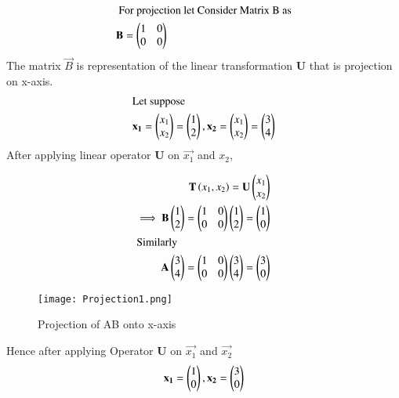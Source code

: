 \documentclass[journal,12pt,twocolumn]{IEEEtran}
\begin{document}
\begin{align}
\intertext{ For projection let Consider Matrix B as} \mathbf{B} = \begin{pmatrix}1 & 0 \\ 0 & 0 \end{pmatrix} 
\end{align}
The matrix  $\vec{B}$ is representation  of the linear transformation \textbf{U} that is projection on x-axis.
\begin{align}
\intertext{Let suppose}\mathbf{x_1} =\begin{pmatrix}x_1 \\ x_2\end{pmatrix} = \begin{pmatrix}1 \\ 2\end{pmatrix},\mathbf{x_2} =\begin{pmatrix}x_1 \\ x_2\end{pmatrix} =\begin{pmatrix}3 \\ 4\end{pmatrix} 
\end{align}
After applying linear operator \textbf{U} on $\vec{x_1}$ and $x_2$,

\begin{align}
\textbf{T}\left(x_1, x_2\right) = \mathbf{U}\begin{pmatrix} x_1  \\ x_2\end{pmatrix}\\
\implies   \mathbf{B}\begin{pmatrix}1 \\ 2\end{pmatrix} =  \begin{pmatrix}1 & 0 \\ 0 & 0 \end{pmatrix} \begin{pmatrix}1 \\ 2\end{pmatrix} = \begin{pmatrix}1 \\ 0\end{pmatrix}\\
\intertext{Similarly}
\mathbf{A}\begin{pmatrix}3 \\ 4\end{pmatrix} =  \begin{pmatrix}1 & 0 \\ 0 & 0 \end{pmatrix} \begin{pmatrix}3 \\ 4\end{pmatrix} = \begin{pmatrix}3 \\ 0\end{pmatrix}
\end{align}

\begin{figure}[htb!]	
	\centering	
	\texttt{[image: Projection1.png]}	
	\caption{Projection of AB onto x-axis}
	\label{fig2}	
\end{figure}
Hence after  applying Operator \textbf{U} on $\vec{x_1}$ and $\vec{x_2}$
\begin{align}
\mathbf{x_1} = \begin{pmatrix}1\\0\end{pmatrix}, \mathbf{x_2} =\begin{pmatrix}3\\0\end{pmatrix}
\end{align}
\end{document}
